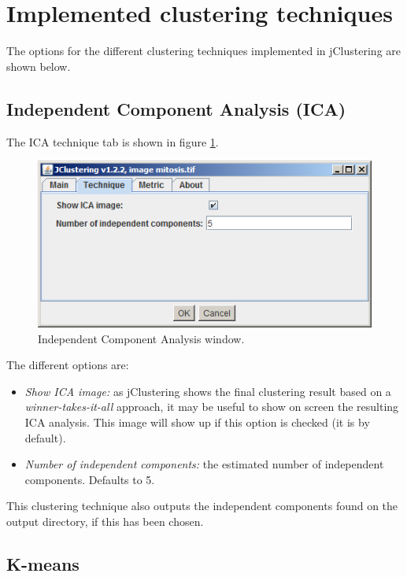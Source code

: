 \documentclass[11pt]{article} %
\begin{document}
\section{Implemented clustering techniques}

The options for the different clustering techniques implemented in jClustering are shown below.

\subsection{Independent Component Analysis (ICA)}

The ICA technique tab is shown in figure \ref{fig:ica_window}.

\begin{figure}[h!]
  \centering
    \includegraphics[width=\textwidth]{figures/ica_window}
  \caption{Independent Component Analysis window.}
  \label{fig:ica_window}
\end{figure}

The different options are:

\begin{itemize}
\item {\em Show ICA image:} as jClustering shows the final clustering result based on a \emph{winner-takes-it-all} approach,
it may be useful to show on screen the resulting ICA analysis. This image will show up if this option is checked (it is by default).

\item {\em Number of independent components:} the estimated number of independent components. Defaults to 5.

\end{itemize}

This clustering technique also outputs the independent components found on the output directory, if this has been chosen.

\subsection{K-means}
\end{document}
